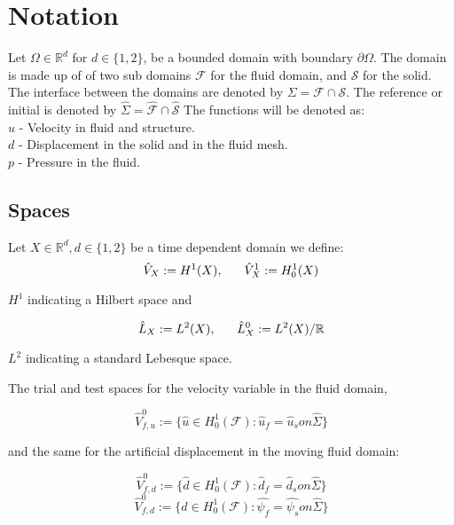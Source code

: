 \section{Notation}
Let $\Omega \in \mathbb{R}^d $ for $d \in \{1,2\}$, be a bounded domain with boundary $ \partial \Omega$. The domain is made up of of two sub domains $ \mathcal{F} $ for the fluid domain, and $\mathcal{S}$ for the solid. The interface between the domains are denoted by $ \Sigma = \mathcal{F} \cap \mathcal{S} $. The reference or initial is denoted by $ \hat{\Sigma} = \hat{\mathcal{F}} \cap \hat{\mathcal{S}}  $ 
The functions will be denoted as: \\
$u$ - Velocity in fluid and structure. \\
$d$ - Displacement in the solid and in the fluid mesh.\\
$p$ - Pressure in the fluid. \\

\subsection{Spaces}
Let $ X \in \mathbb{R}^d , d \in\{ 1,2  \} $ be a time dependent domain we define:\\

\begin{equation}
\hat{V}_X := H^1(X), \hspace{6mm}  \hat{V}^1_X := H^1_0(X) \\
\end{equation}

$ H^1 $ indicating a Hilbert space and

\begin{equation}
\hat{L}_X := L^2(X), \hspace{6mm} \hat{L}^0_X := L^2(X) / \mathbb{R}
\end{equation}

$L^2$ indicating a standard Lebesque space.

The trial and test spaces for the velocity variable in the fluid domain,

\begin{equation}
\hat{V}^0_{f,u} := \{ \hat{u} \in H^1_0(\mathcal{F}) : \hat{u}_f = \hat{u}_s on \hat{\Sigma}  \}
\end{equation}

and the same for the artificial displacement in the moving fluid domain:

\begin{equation}
\hat{V}^0_{f,d} := \{ \hat{d} \in H^1_0(\mathcal{F}) : \hat{d}_f = \hat{d}_s on \hat{\Sigma}  \}
\end{equation}
\begin{equation}
\hat{V}^0_{f,d} := \{ \hat{d} \in H^1_0(\mathcal{F}) : \hat{\psi_f} = \hat{\psi_s} on \hat{\Sigma}  \}
\end{equation}



   


